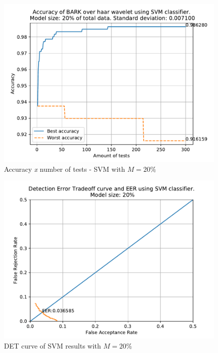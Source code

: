 	\begin{figure}[H]
		\centering
		\includegraphics[scale=.8]{images/results/confusionMatrices/classifier_SVM_20.pdf}
		\caption{Accuracy \textit{x} number of tests - SVM with $M=20\%$}
		\label{fig:classifiersvm20}
	\end{figure}
	\begin{figure}[H]
		\centering
		\includegraphics[scale=.8]{images/results/det/DET_for_classifier_SVM_20.pdf}
		\caption{DET curve of SVM results with $M=20\%$}
		\label{fig:detsvm20}
	\end{figure}
